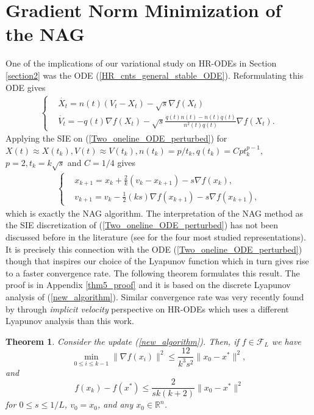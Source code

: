 \documentclass{article}
\theoremstyle{plain}
\newtheorem{theorem}{Theorem}[section]
\theoremstyle{definition}
\theoremstyle{remark}
\begin{document}
\section{Gradient Norm Minimization of the NAG}\label{section3}
One of the implications of our variational study on HR-ODEs in Section \ref{section2} was the ODE (\ref{HR_cnts_general_stable_ODE}). Reformulating this ODE gives
\begin{align}\label{Two_oneline_ODE_perturbed}
   \left\{ \begin{array}{ll}
    & \dot{X_t}   =     n(t)(V_t-X_t)-\sqrt{s}\nabla f(X_t)\\
     &\dot{V_t}    =  -q(t)\nabla f(X_t) - \sqrt{s}\frac{\dot q(t)n(t)-\dot n(t)q(t)}{n^2(t)q(t)} \nabla f(X_t).
    \end{array}\right.
\end{align}
Applying the SIE on (\ref{Two_oneline_ODE_perturbed}) for \({X(t) \approx X(t_k), V(t)\approx V(t_k),n(t_k)=p/t_k,q(t_k)=Cpt_k^{p-1},}\) 
\({ p=2,t_k=k\sqrt{s}}\) and \(C=1/4\) gives 
\begin{align}\label{new_algorithm}
   \left\{ \begin{array}{ll}
    &x_{k+1}   =    x_{k} + \frac{2}{k}(v_k-x_{k+1})-{s}\nabla f(x_k),\\
     &v_{k+1}    = v_k -\tfrac{1}{2}(ks)\nabla f(x_{k+1})-s\nabla f(x_{k+1}), 
    \end{array}\right.
\end{align}
 which is exactly the NAG algorithm. The interpretation of the NAG method as the SIE discretization of (\ref{Two_oneline_ODE_perturbed}) has not been discussed before in the literature (see \citep{ahn2022understanding} for the four most studied representations). It is precisely this connection with the ODE (\ref{Two_oneline_ODE_perturbed}) though that inspires our choice of the Lyapunov function which in turn gives rise to a faster convergence rate. The following theorem formulates this result. The proof is in Appendix \ref{thm5_proof} and it is based on the discrete Lyapunov analysis of (\ref{new_algorithm}). Similar convergence rate was very recently found by \citep{chen2022gradient} through \textit{implicit velocity} perspective on HR-ODEs which uses a different Lyapunov analysis than this work.
\begin{theorem}\label{theorem4}
    Consider the update (\ref{new_algorithm}). Then, if \(f\in\mathcal{F}_L\) we have
    \[\min_{0\leq i\leq k-1}\|\nabla f(x_i)\|^2 \leq \frac{12}{k^3s^2}\|x_0-x^*\|^2,\]
    and
    \[f(x_k)-f(x^*)\leq \frac{2}{sk(k+2)}\|x_0-x^*\|^2\]
    for \(0\leq s\leq 1/L\), \(v_0=x_0\), and any \(x_0\in \mathbb R^n\).
\end{theorem}
\end{document}
